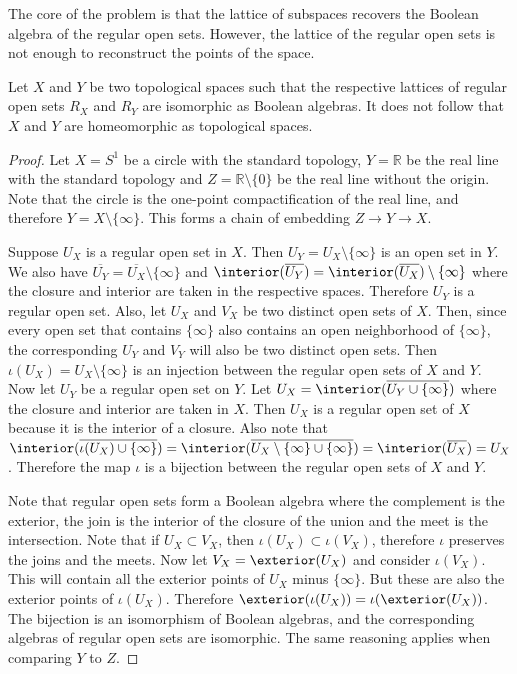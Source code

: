 The core of the problem is that the lattice of subspaces recovers the Boolean algebra of the regular open sets. However, the lattice of the regular open sets is not enough to reconstruct the points of the space.

\begin{prop}\label{pm-es-regularOpenSetsNotEnough}
	Let $X$ and $Y$ be two topological spaces such that the respective lattices of regular open sets $R_X$ and $R_Y$ are isomorphic as Boolean algebras. It does not follow that $X$ and $Y$ are homeomorphic as topological spaces.
\end{prop}

\begin{proof}
	Let $X=S^1$ be a circle with the standard topology, $Y=\mathbb{R}$ be the real line with the standard topology and $Z=\mathbb{R}\setminus \{0\}$ be the real line without the origin. Note that the circle is the one-point compactification of the real line, and therefore $Y=X\setminus \{\infty\}$. This forms a chain of embedding $Z \to Y \to X$.
	
	Suppose $U_X$ is a regular open set in $X$. Then $U_Y = U_X \setminus \{\infty\}$ is an open set in $Y$. We also have $\overline{U_Y} = \overline{U_X} \setminus \{\infty\}$ and $\interior(\overline{U_Y}) = \interior(\overline{U_X}) \setminus \{\infty\}$ where the closure and interior are taken in the respective spaces. Therefore $U_Y$ is a regular open set. Also, let $U_X$ and $V_X$ be two distinct open sets of $X$. Then, since every open set that contains $\{\infty\}$ also contains an open neighborhood of $\{\infty\}$, the corresponding $U_Y$ and $V_Y$ will also be two distinct open sets. Then $\iota(U_X) = U_X \setminus \{\infty\}$ is an injection between the regular open sets of $X$ and $Y$. Now let $U_Y$ be a regular open set on $Y$. Let $U_X = \interior(\overline{U_Y \cup \{ \infty \}})$ where the  closure and interior are taken in $X$. Then $U_X$ is a regular open set of $X$ because it is the interior of a closure. Also note that $\interior(\overline{\iota(U_X) \cup \{ \infty \}}) = \interior(\overline{U_X \setminus \{\infty\} \cup \{ \infty \}}) = \interior(\overline{U_X}) = U_X$. Therefore the map $\iota$ is a bijection between the regular open sets of $X$ and $Y$.
	
	Note that regular open sets form a Boolean algebra where the complement is the exterior, the join is the interior of the closure of the union and the meet is the intersection. Note that if $U_X \subset V_X$, then $\iota(U_X) \subset \iota(V_X)$, therefore $\iota$ preserves the joins and the meets. Now let $V_X = \exterior(U_X)$ and consider $\iota(V_X)$. This will contain all the exterior points of $U_X$ minus $\{\infty\}$. But these are also the exterior points of $\iota(U_X)$. Therefore $\exterior(\iota(U_X)) = \iota(\exterior(U_X))$. The bijection is an isomorphism of Boolean algebras, and the corresponding algebras of regular open sets are isomorphic. The same reasoning applies when comparing $Y$ to $Z$.
	

\end{proof}

